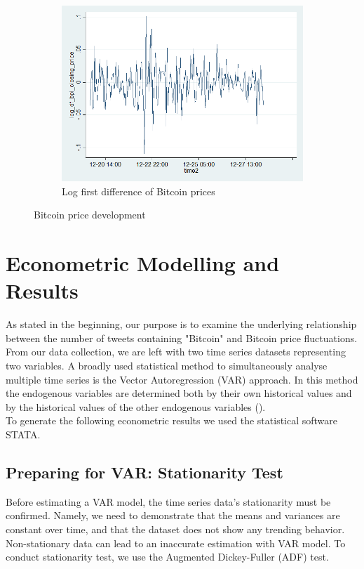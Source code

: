 \documentclass[a4paper,american,12pt]{article}
\begin{document}
\begin{spacing}{1.2}
\begin{figure}[H]
\begin{subfigure}{.3\textwidth}
	\includegraphics[width=1.12\textwidth]{stata_export_graphs/graph_plot_log_df_bpi.png}
	\caption{Log first difference of Bitcoin prices}
	\end{subfigure}
\caption{Bitcoin price development}
\end{figure}
	
\clearpage

\section{Econometric Modelling and Results}
\label{sec:EconometricModellingandResults}
As stated in the beginning, our purpose is to examine the underlying relationship between the number of tweets containing "Bitcoin" and Bitcoin price fluctuations. From our data collection, we are left with two time series datasets representing two variables. A broadly used statistical method to simultaneously analyse multiple time series is the Vector Autoregression (VAR) approach. In this method the endogenous variables are determined both by their own historical values and by the historical values of the other endogenous variables (\cite[pp.~4--5]{luetkepohl2007new}).\\
To generate the following econometric results we used the statistical software STATA.

\subsection{Preparing for VAR: Stationarity Test}
Before estimating a VAR model, the time series data's stationarity must be confirmed. Namely, we need to demonstrate that the means and variances are constant over time, and that the dataset does not show any trending behavior. Non-stationary data can lead to an inaccurate estimation with VAR model. To conduct stationarity test, we use the Augmented Dickey-Fuller (ADF) test.\\


\end{spacing}
\end{document}
